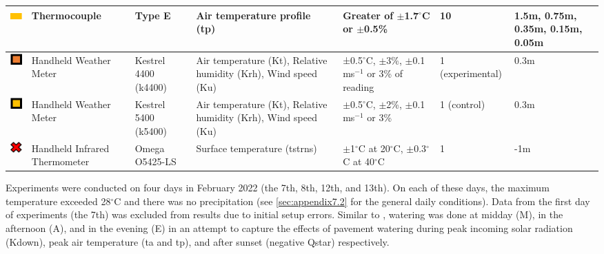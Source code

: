 \documentclass[final,3p,times,authoryear]{elsarticle}
\begin{document}
\begin{table}[!ht]
\begin{tabular}{|p{0.90cm}|p{2.0cm}|p{2.0cm}|p{3.5cm}|p{2.5cm}|p{1.0cm}|p{1.0cm}|}
\includegraphics[trim={0 0 0 0},clip,scale=0.5]{Picture6.png}&Thermocouple&Type E&Air temperature profile (\gls{tp})&Greater of $\pm$1.7$^{\circ}$C or $\pm$0.5\%&10&1.5m, 0.75m, 0.35m, 0.15m, 0.05m \\ \hline     
\includegraphics[trim={0 0 0 0},clip,scale=0.5]{Picture7.png}&Handheld Weather Meter&Kestrel 4400 (k4400)&Air temperature (\gls{Kt}), Relative humidity (\gls{Krh}), Wind speed (\gls{Ku})&±0.5$^{\circ}$C, $\pm$3\%, $\pm$0.1 ms$^{-1}$ or 3\% of reading&1 (experimental)&0.3m \\ \hline
\includegraphics[trim={0 0 0 0},clip,scale=0.5]{Picture8.png}&Handheld Weather Meter&Kestrel 5400 (k5400)&Air temperature (\gls{Kt}), Relative humidity (\gls{Krh}), Wind speed (\gls{Ku})&$\pm$0.5$^{\circ}$C, $\pm$2\%, $\pm$0.1 ms$^{-1}$ or 3\%&1 (control)&0.3m \\ \hline 
\includegraphics[trim={0 0 0 0},clip,scale=0.5]{Picture9.png}&Handheld Infrared Thermometer&Omega O5425-LS&Surface temperature (\gls{tstrns})&$\pm$1$^{\circ}$C at 20$^{\circ}$C, $\pm$0.3$^{\circ}$C at 40$^{\circ}$C&1&-1m \\ \hline           
\end{tabular}\label{table:2.1}
\end{table}



Experiments were conducted on four days in February 2022 (the 7th, 8th, 12th, and 13th). On each of these days, the maximum temperature exceeded 28$^{\circ}$C and there was no precipitation (see \ref{sec:appendix7.2} for the general daily conditions). Data from the first day of experiments (the 7th) was excluded from results due to initial setup errors. Similar to \cite{Middel2021}, watering was done at midday (M), in the afternoon (A), and in the evening (E) in an attempt to capture the effects of pavement watering during peak incoming solar radiation (\gls{Kdown}), peak air temperature (\gls{ta} and \gls{tp}), and after sunset (negative \gls{Qstar}) respectively.
\end{document}
